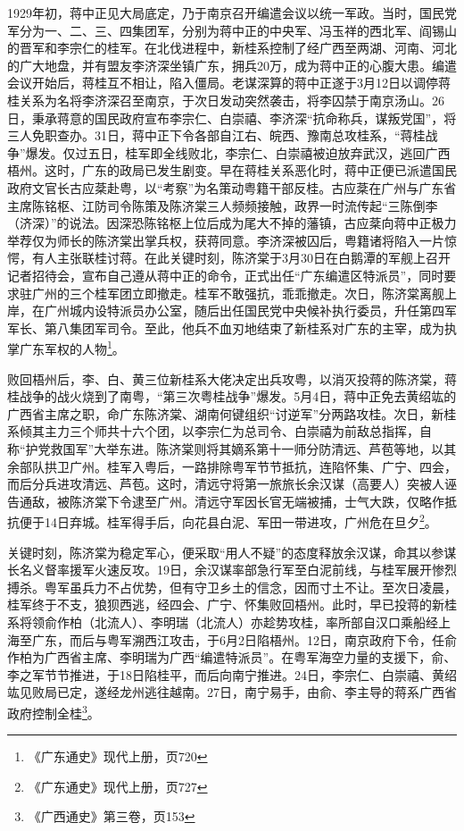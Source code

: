 1929年初，蒋中正见大局底定，乃于南京召开编遣会议以统一军政。当时，国民党军分为一、二、三、四集团军，分别为蒋中正的中央军、冯玉祥的西北军、阎锡山的晋军和李宗仁的桂军。在北伐进程中，新桂系控制了经广西至两湖、河南、河北的广大地盘，并有盟友李济深坐镇广东，拥兵20万，成为蒋中正的心腹大患。编遣会议开始后，蒋桂互不相让，陷入僵局。老谋深算的蒋中正遂于3月12日以调停蒋桂关系为名将李济深召至南京，于次日发动突然袭击，将李囚禁于南京汤山。26日，秉承蒋意的国民政府宣布李宗仁、白崇禧、李济深“抗命称兵，谋叛党国”，将三人免职查办。31日，蒋中正下令各部自江右、皖西、豫南总攻桂系，“蒋桂战争”爆发。仅过五日，桂军即全线败北，李宗仁、白崇禧被迫放弃武汉，逃回广西梧州。这时，广东的政局已发生剧变。早在蒋桂关系恶化时，蒋中正便已派遣国民政府文官长古应棻赴粤，以“考察”为名策动粤籍干部反桂。古应棻在广州与广东省主席陈铭枢、江防司令陈策及陈济棠三人频频接触，政界一时流传起“三陈倒李（济深）”的说法。因深恐陈铭枢上位后成为尾大不掉的藩镇，古应棻向蒋中正极力举荐仅为师长的陈济棠出掌兵权，获蒋同意。李济深被囚后，粤籍诸将陷入一片惊愕，有人主张联桂讨蒋。在此关键时刻，陈济棠于3月30日在白鹅潭的军舰上召开记者招待会，宣布自己遵从蒋中正的命令，正式出任“广东编遣区特派员”，同时要求驻广州的三个桂军团立即撤走。桂军不敢强抗，乖乖撤走。次日，陈济棠离舰上岸，在广州城内设特派员办公室，随后出任国民党中央候补执行委员，升任第四军军长、第八集团军司令。至此，他兵不血刃地结束了新桂系对广东的主宰，成为执掌广东军权的人物\footnote{《广东通史》现代上册，页720}。

败回梧州后，李、白、黄三位新桂系大佬决定出兵攻粤，以消灭投蒋的陈济棠，蒋桂战争的战火烧到了南粤，“第三次粤桂战争”爆发。5月4日，蒋中正免去黄绍竑的广西省主席之职，命广东陈济棠、湖南何键组织“讨逆军”分两路攻桂。次日，新桂系倾其主力三个师共十六个团，以李宗仁为总司令、白崇禧为前敌总指挥，自称“护党救国军”大举东进。陈济棠则将其嫡系第十一师分防清远、芦苞等地，以其余部队拱卫广州。桂军入粤后，一路排除粤军节节抵抗，连陷怀集、广宁、四会，而后分兵进攻清远、芦苞。这时，清远守将第一旅旅长余汉谋（高要人）突被人诬告通敌，被陈济棠下令逮至广州。清远守军因长官无端被捕，士气大跌，仅略作抵抗便于14日弃城。桂军得手后，向花县白泥、军田一带进攻，广州危在旦夕\footnote{《广东通史》现代上册，页727}。

关键时刻，陈济棠为稳定军心，便采取“用人不疑”的态度释放余汉谋，命其以参谋长名义督率援军火速反攻。19日，余汉谋率部急行军至白泥前线，与桂军展开惨烈搏杀。粤军虽兵力不占优势，但有守卫乡土的信念，因而寸土不让。至次日凌晨，桂军终于不支，狼狈西逃，经四会、广宁、怀集败回梧州。此时，早已投蒋的新桂系将领俞作柏（北流人）、李明瑞（北流人）亦趁势攻桂，率所部自汉口乘船经上海至广东，而后与粤军溯西江攻击，于6月2日陷梧州。12日，南京政府下令，任俞作柏为广西省主席、李明瑞为广西“编遣特派员”。在粤军海空力量的支援下，俞、李之军节节推进，于18日陷桂平，而后向南宁推进。24日，李宗仁、白崇禧、黄绍竑见败局已定，遂经龙州逃往越南。27日，南宁易手，由俞、李主导的蒋系广西省政府控制全桂\footnote{《广西通史》第三卷，页153}。

